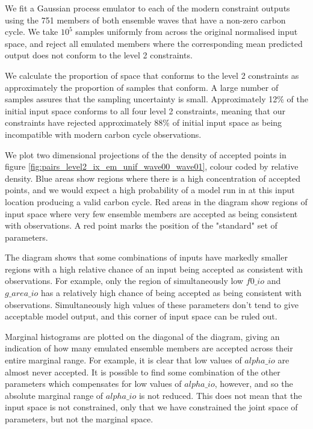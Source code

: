 \documentclass[gmd, manuscript]{copernicus}
\begin{document}
We fit a Gaussian process emulator to each of the modern constraint outputs using the 751 members of both ensemble waves that have a non-zero carbon cycle. We take $10^{5}$ samples uniformly from across the original normalised input space, and reject all emulated members where the corresponding mean predicted output does not conform to the level 2 constraints.

We calculate the proportion of space that conforms to the level 2 constraints as approximately the proportion of samples that conform. A large number of samples assures that the sampling uncertainty is small. Approximately 12\% of the initial input space conforms to all four level 2 constraints, meaning that our constraints have rejected approximately 88\% of initial input space as being incompatible with modern carbon cycle observations.

We plot two dimensional projections of the the density of accepted points in figure \ref{fig:pairs_level2_ix_em_unif_wave00_wave01}, colour coded by relative density. Blue areas show regions where there is a high concentration of accepted points, and we would expect a high probability of a model run in at this input location producing a valid carbon cycle. Red areas in the diagram show regions of input space where very few ensemble members are accepted as being consistent with observations. A red point marks the position of the "standard" set of parameters.

The diagram shows that some combinations of inputs have markedly smaller regions with a high relative chance of an input being accepted as consistent with observations. For example, only the region of simultaneously low $f0\_io$ and $g\_area\_io$ has a relatively high chance of being accepted as being consistent with observations. Simultaneously high values of these parameters don't tend to give acceptable model output, and this corner of input space can be ruled out.

Marginal histograms are plotted on the diagonal of the diagram, giving an indication of how many emulated ensemble members are accepted across their entire marginal range. For example, it is clear that low values of $alpha\_io$ are almost never accepted. It is possible to find some combination of the other parameters which compensates for low values of $alpha\_io$, however, and so the absolute marginal range of $alpha\_io$ is not reduced. This does not mean that the input space is not constrained, only that we have constrained the joint space of parameters, but not the marginal space.
\end{document}
